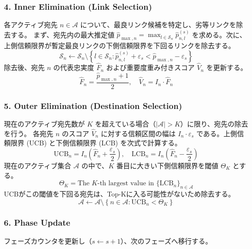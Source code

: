 \documentclass[conference]{IEEEtran}
\begin{document}
\subsubsection{4. Inner Elimination (Link Selection)}
各アクティブ宛先 $n \in \mathcal{A}$ について、最良リンク候補を特定し、劣等リンクを除去する。
まず、宛先内の最大推定値 $\hat{p}_{\max,n} = \max_{l \in \mathcal{S}_n} \hat{p}_{n,l}^{(s)}$ を求める。次に、上側信頼限界が暫定最良リンクの下側信頼限界を下回るリンクを除去する。
\begin{equation}
    \mathcal{S}_n \leftarrow \mathcal{S}_n \setminus \left\{ l \in \mathcal{S}_n : \hat{p}_{n,l}^{(s)} + \varepsilon_s < \hat{p}_{\max,n} - \varepsilon_s \right\}
\end{equation}
除去後、宛先 $n$ の代表忠実度 $\hat{F}_n$ および重要度重み付きスコア $\hat{V}_n$ を更新する。
\begin{equation}
    \hat{F}_n = \frac{\hat{p}_{\max,n} + 1}{2}, \quad \hat{V}_n = I_n \cdot \hat{F}_n
\end{equation}

\subsubsection{5. Outer Elimination (Destination Selection)}
現在のアクティブ宛先数が $K$ を超えている場合（$|\mathcal{A}| > K$）に限り、宛先の除去を行う。
各宛先 $n$ のスコア $\hat{V}_n$ に対する信頼区間の幅は $I_n \cdot \varepsilon_s$ である。上側信頼限界 (UCB) と下側信頼限界 (LCB) を次式で計算する。
\begin{equation}
    \mathrm{UCB}_n = I_n \left( \hat{F}_n + \frac{\varepsilon_s}{2} \right), \quad \mathrm{LCB}_n = I_n \left( \hat{F}_n - \frac{\varepsilon_s}{2} \right)
\end{equation}
現在のアクティブ集合 $\mathcal{A}$ の中で、$K$ 番目に大きい下側信頼限界を閾値 $\Theta_K$ とする。
\begin{equation}
    \Theta_K = \text{The } K\text{-th largest value in } \{ \mathrm{LCB}_n \}_{n \in \mathcal{A}}
\end{equation}
UCBがこの閾値を下回る宛先は、Top-Kに入る可能性がないため除去する。
\begin{equation}
    \mathcal{A} \leftarrow \mathcal{A} \setminus \left\{ n \in \mathcal{A} : \mathrm{UCB}_n < \Theta_K \right\}
\end{equation}

\subsubsection{6. Phase Update}
フェーズカウンタを更新し（$s \leftarrow s + 1$）、次のフェーズへ移行する。
\end{document}
